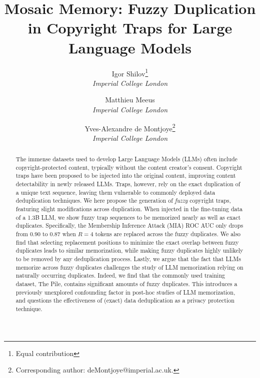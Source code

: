 \documentclass[twocolumn,10pt]{article}
\begin{document}
\title{\Large \bf Mosaic Memory: Fuzzy Duplication in Copyright Traps for Large Language Models
        \vspace*{0.5cm}}

\date{}

\author{
 {\rm Igor Shilov\thanks{Equal contribution}}\\
 \textit{Imperial College London}
 \and
 {\rm Matthieu Meeus\footnotemark[1]}\\
 \textit{Imperial College London}
 \and
 {\rm Yves-Alexandre de Montjoye\footnote{Corresponding author: deMontjoye@imperial.ac.uk.}}\\
 \textit{Imperial College London}
} %


\maketitle

\vskip 0.3in

\begin{abstract}

The immense datasets used to develop Large Language Models (LLMs) often include copyright-protected content, typically without the content creator's consent. Copyright traps have been proposed to be injected into the original content, improving content detectability in newly released LLMs. Traps, however, rely on the exact duplication of a unique text sequence, leaving them vulnerable to commonly deployed data deduplication techniques. We here propose the generation of \emph{fuzzy} copyright traps, featuring slight modifications across duplication. When injected in the fine-tuning data of a 1.3B LLM, we show fuzzy trap sequences to be memorized nearly as well as exact duplicates. Specifically, the Membership Inference Attack (MIA) ROC AUC only drops from $0.90$ to $0.87$ when $R=4$ tokens are replaced across the fuzzy duplicates. We also find that selecting replacement positions to minimize the exact overlap between fuzzy duplicates leads to similar memorization, while making fuzzy duplicates highly unlikely to be removed by any deduplication process. Lastly, we argue that the fact that LLMs memorize across fuzzy duplicates challenges the study of LLM memorization relying on naturally occurring duplicates. Indeed, we find that the commonly used training dataset, The Pile, contains significant amounts of fuzzy duplicates. This introduces a previously unexplored confounding factor in post-hoc studies of LLM memorization, and questions the effectiveness of (exact) data deduplication as a privacy protection technique. 
\end{abstract}
\end{document}
